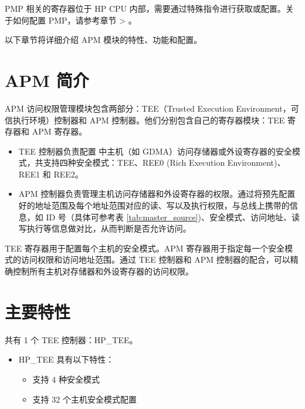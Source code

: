 \documentclass[main\_\_CN.tex]{subfiles}
\begin{document}
PMP 相关的寄存器位于 HP CPU 内部，需要通过特殊指令进行获取或配置。关于如何配置 PMP，请参考章节 \textit{} > \textit{}。

以下章节将详细介绍 APM 模块的特性、功能和配置。

\section{APM 简介}

APM 访问权限管理模块包含两部分：TEE（Trusted Execution Environment，可信执行环境）控制器和 APM 控制器。他们分别包含自己的寄存器模块：TEE 寄存器和 APM 寄存器。

\begin{itemize}
    \item TEE 控制器负责配置 \chipname{} 中主机（如 GDMA）访问存储器或外设寄存器的安全模式，共支持四种安全模式：TEE、REE0 (Rich Execution Environment)、REE1 和 REE2。
    \item APM 控制器负责管理主机访问存储器和外设寄存器的权限。通过将预先配置好的地址范围及每个地址范围对应的读、写以及执行权限，与总线上携带的信息，如 ID 号（具体可参考表 \ref{tab:master_source})、安全模式、访问地址、读写执行等信息做对比，从而判断是否允许访问。
\end{itemize}

TEE 寄存器用于配置每个主机的安全模式。APM 寄存器用于指定每一个安全模式的访问权限和访问地址范围。通过 TEE 控制器和 APM 控制器的配合，可以精确控制所有主机对存储器和外设寄存器的访问权限。

\section{主要特性}\label{sec:permctrl-features}

\chipname{} 共有 1 个 TEE 控制器：HP\_TEE。
\begin{itemize}
    \item HP\_TEE 具有以下特性：
        \begin{itemize}
        \item 支持 4 种安全模式
        \item 支持 32 个主机安全模式配置
        \end{itemize}
\end{itemize}
\end{document}
